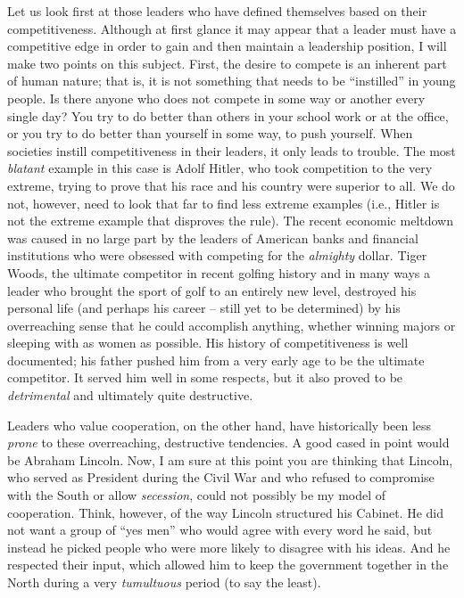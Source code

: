 Let us look first at those leaders who have defined themselves based on their competitiveness.
Although at first glance it may appear that a leader must have a competitive edge in order to gain and then maintain a leadership position, I will make two points on this subject.
First, the desire to compete is an inherent part of human nature;
that is, it is not something that needs to be ``instilled'' in young people.
Is there anyone who does not compete in some way or another every single day?
You try to do better than others in your school work or at the office, or you try to do better than yourself in some way, to push yourself.
When societies instill competitiveness in their leaders, it only leads to trouble.
The most \emph{blatant} example in this case is Adolf Hitler, who took competition to the very extreme, trying to prove that his race and his country were superior to all.
We do not, however, need to look that far to find less extreme examples (i.e., Hitler is not the extreme example that disproves the rule).
The recent economic meltdown was caused in no large part by the leaders of American banks and financial institutions who were obsessed with competing for the \emph{almighty} dollar.
Tiger Woods, the ultimate competitor in recent golfing history and in many ways a leader who brought the sport of golf to an entirely new level, destroyed his personal life (and perhaps his career -- still yet to be determined) by his overreaching sense that he could accomplish anything, whether winning majors or sleeping with as women as possible.
His history of competitiveness is well documented; his father pushed him from a very early age to be the ultimate competitor.
It served him well in some respects, but it also proved to be \emph{detrimental} and ultimately quite destructive.

Leaders who value cooperation, on the other hand, have historically been less \emph{prone} to these overreaching, destructive tendencies.
A good cased in point would be Abraham Lincoln.
Now, I am sure at this point you are thinking that Lincoln, who served as President during the Civil War and who refused to compromise with the South or allow \emph{secession}, could not possibly be my model of cooperation.
Think, however, of the way Lincoln structured his Cabinet.
He did not want a group of ``yes men'' who would agree with every word he said, but instead he picked people who were more likely to disagree with his ideas.
And he respected their input, which allowed him to keep the government together in the North during a very \emph{tumultuous} period (to say the least).

